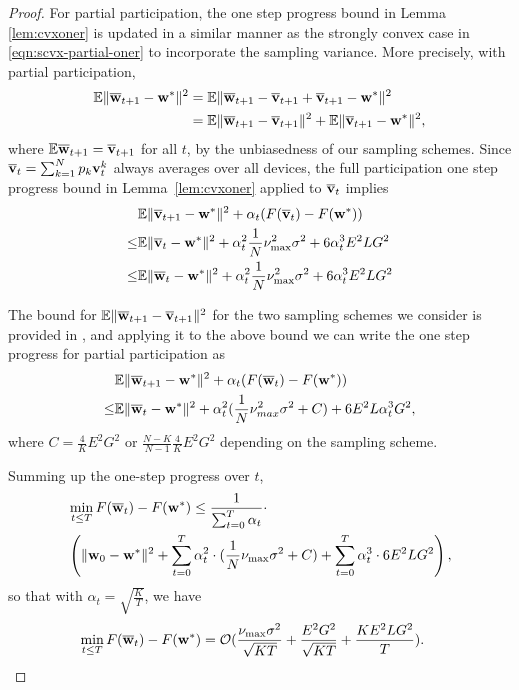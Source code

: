 \begin{proof}
For partial participation, the one step progress bound in Lemma \ref{lem:cvxoner} is updated in a similar manner as the strongly convex case in \eqref{eqn:scvx-partial-oner} to incorporate the sampling variance. More precisely, with partial participation,  
	\begin{align*}
	\mathbb{E}\|{\overline{\mathbf{w}}}_{t+1}-{\mathbf{w}}^{\ast}\|^{2} & =\mathbb{E}\|{\overline{\mathbf{w}}}_{t+1}-{\overline{\mathbf{v}}}_{t+1}+{\overline{\mathbf{v}}}_{t+1}-{\mathbf{w}}^{\ast}\|^{2}\\
	& =\mathbb{E}\|{\overline{\mathbf{w}}}_{t+1}-{\overline{\mathbf{v}}}_{t+1}\|^{2}+\mathbb{E}\|{\overline{\mathbf{v}}}_{t+1}-{\mathbf{w}}^{\ast}\|^{2},
	\end{align*}
	where $\mathbb{E}{\overline{\mathbf{w}}}_{t+1}={\overline{\mathbf{v}}}_{t+1}$ for all $t$, by the unbiasedness of our sampling schemes. Since ${\overline{\mathbf{v}}}_t =\sum_{k=1}^{N} p_{k} \mathbf{v}_{t}^{k}$ always averages over all devices, the full participation one step progress bound in Lemma~\ref{lem:cvxoner} applied to ${\overline{\mathbf{v}}}_t$ implies
	\begin{align*}
	&\mathbb{E}\|{\overline{\mathbf{v}}}_{t+1}-{\mathbf{w}}^{\ast}\|^{2}+\alpha_{t}(F({\overline{\mathbf{v}}}_{t})-F({\mathbf{w}}^{\ast})) \\ \leq &\mathbb{E}\|{\overline{\mathbf{v}}}_{t}-{\mathbf{w}}^{\ast}\|^{2}+\alpha_{t}^{2}\frac{1}{N}\nu_{\max}^{2}\sigma^{2}
	+6\alpha_{t}^{3}E^{2}LG^{2}\\
	 \leq&\mathbb{E}\|{\overline{\mathbf{w}}}_{t}-{\mathbf{w}}^{\ast}\|^{2}+\alpha_{t}^{2}\frac{1}{N}\nu_{\max}^{2}\sigma^{2}+6\alpha_{t}^{3}E^{2}LG^{2}
	\end{align*}
	
	The bound for $\mathbb{E}\|{\overline{\mathbf{w}}}_{t+1}-{\overline{\mathbf{v}}}_{t+1}\|^{2}$ for the two sampling schemes we consider is provided in \eq{\ref{eq:partialsample}}, and applying it to the above bound we can write the one step progress for partial participation as
	\begin{align*}
	&\mathbb{E}\|{\overline{\mathbf{w}}}_{t+1}-{\mathbf{w}}^{\ast}\|^{2} + \alpha_{t}(F({\overline{\mathbf{w}}}_{t})-F({\mathbf{w}}^{\ast}))\\ \leq&\mathbb{E}\|{\overline{\mathbf{w}}}_{t}-{\mathbf{w}}^{\ast}\|^{2}
	+\alpha_{t}^{2}(\frac{1}{N}\nu_{max}^{2}\sigma^{2}+C)+6E^{2}L\alpha_{t}^{3}G^{2},
	\end{align*}
	where $C=\frac{4}{K}E^{2}G^{2}$ or $\frac{N-K}{N-1}\frac{4}{K}E^{2}G^{2}$ depending on the sampling scheme.
	
	Summing up the one-step progress over $t$, 
	\begin{align*}
	&\min_{t\leq T}F({\overline{\mathbf{w}}}_{t})-F({\mathbf{w}}^{\ast}) \leq\frac{1}{\sum_{t=0}^{T}\alpha_{t}}\cdot\\ &\left(\|{\mathbf{w}}_{0}-{\mathbf{w}}^{\ast}\|^{2}+\sum_{t=0}^{T}\alpha_{t}^{2}\cdot(\frac{1}{N}\nu_{\max}\sigma^{2}+C)+\sum_{t=0}^{T}\alpha_{t}^{3}\cdot6E^{2}LG^{2}\right),
	\end{align*}
	so that with $\alpha_{t}=\sqrt{\frac{K}{T}}$, we have 
	\begin{align*}
	\min_{t\leq T}F({\overline{\mathbf{w}}}_{t})-F({\mathbf{w}}^{\ast}) & =\mathcal{O}(\frac{\nu_{\max}\sigma^{2}}{\sqrt{KT}}+\frac{E^{2}G^{2}}{\sqrt{KT}}+\frac{KE^{2}LG^{2}}{T}).
	\end{align*}
\end{proof}